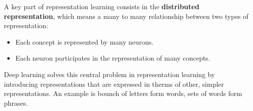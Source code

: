 A key part of representation learning consists in the \textbf{distributed 
    representation}, which means a many to many relationship between two types
of representation:
\begin{itemize}
    \item Each concept is represented by many neurons.
    \item Each neuron participates in the representation of many concepts.
\end{itemize}

Deep learning solves this central problem in representation learning by introducing
representations that are expressed in therms of other, simpler representations.
An example is bounch of letters form words, sets of words form phrases.
